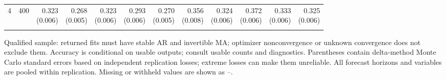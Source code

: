 \begin{table}[p]
{\begin{tabular}{llrrrrrrrrrr}
4 & 400 & \shortstack{0.323\\(0.006)} & \shortstack{0.268\\(0.005)} & \shortstack{0.323\\(0.006)} & \shortstack{0.293\\(0.006)} & \shortstack{0.270\\(0.005)} & \shortstack{0.356\\(0.008)} & \shortstack{0.324\\(0.006)} & \shortstack{0.372\\(0.006)} & \shortstack{0.333\\(0.006)} & \shortstack{0.325\\(0.006)} \\
\addlinespace
\bottomrule\end{tabular}}
\par\medskip
\begin{minipage}{\linewidth}\footnotesize Qualified sample: returned fits must have stable AR and invertible MA; optimizer nonconvergence or unknown convergence does not exclude them. Accuracy is conditional on usable outputs; consult usable counts and diagnostics. Parentheses contain delta-method Monte Carlo standard errors based on independent replication losses; extreme losses can make them unreliable. All forecast horizons and variables are pooled within replication.  Missing or withheld values are shown as --.\end{minipage}
\end{table}
